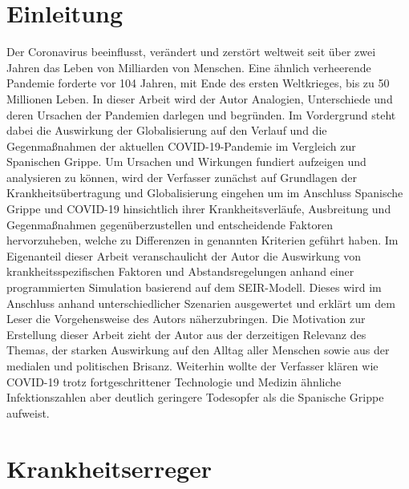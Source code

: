 \documentclass[12pt]{article}
\begin{document}
\section{Einleitung}
Der Coronavirus beeinflusst, verändert und zerstört weltweit seit über zwei Jahren das Leben von Milliarden von Menschen. Eine ähnlich verheerende Pandemie forderte vor 104 Jahren, mit Ende des ersten Weltkrieges, bis zu 50 Millionen Leben. In dieser Arbeit wird der Autor Analogien, Unterschiede und deren Ursachen der Pandemien darlegen und begründen. Im Vordergrund steht dabei die Auswirkung der Globalisierung auf den Verlauf und die Gegenmaßnahmen der aktuellen COVID-19-Pandemie im Vergleich zur Spanischen Grippe. Um Ursachen und Wirkungen fundiert aufzeigen und analysieren zu können, wird der Verfasser zunächst auf Grundlagen der Krankheitsübertragung und Globalisierung eingehen um im Anschluss Spanische Grippe und COVID-19 hinsichtlich ihrer Krankheitsverläufe, Ausbreitung und Gegenmaßnahmen gegenüberzustellen und entscheidende Faktoren hervorzuheben, welche zu Differenzen in genannten Kriterien geführt haben. Im Eigenanteil dieser Arbeit veranschaulicht der Autor die Auswirkung von krankheitsspezifischen Faktoren und Abstandsregelungen anhand einer programmierten Simulation basierend auf dem SEIR-Modell. Dieses wird im Anschluss anhand unterschiedlicher Szenarien ausgewertet und erklärt um dem Leser die Vorgehensweise des Autors näherzubringen. Die Motivation zur Erstellung dieser Arbeit zieht der Autor aus der derzeitigen Relevanz des Themas, der starken Auswirkung auf den Alltag aller Menschen sowie aus der medialen und politischen Brisanz. Weiterhin wollte der Verfasser klären wie COVID-19 trotz fortgeschrittener Technologie und Medizin ähnliche Infektionszahlen aber deutlich geringere Todesopfer als die Spanische Grippe aufweist.

\newpage
\section{Krankheitserreger}\label{sec:Krankheitserreger}
\end{document}
